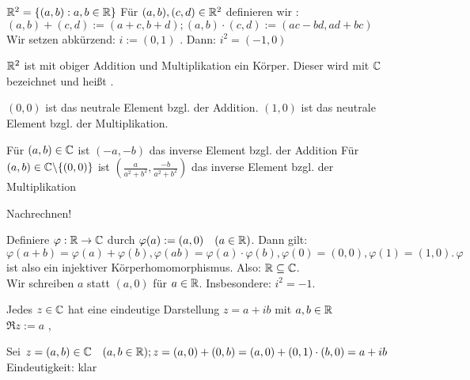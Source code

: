 \documentclass[a4paper,twoside,DIV15,BCOR12mm]{scrbook}
\begin{document}
$\mathbb{R} ^2 = \{(a,b) : a,b \in \mathbb{R}\}$ Für $(a,b),(c,d) \in \mathbb{R} ^2$ definieren wir : \\
$(a,b) + (c,d) := (a+c , b+d); (a,b)\cdot (c,d) := (ac-bd , ad+bc)$ \\
Wir setzen abkürzend: $i := (0,1)$ . Dann: $i^2 = (-1,0)$ \\

\begin{satz}
$\mathbb{R} ^2$ ist mit obiger Addition und Multiplikation ein Körper. Dieser wird mit $\mathbb{C}$ bezeichnet und heißt .

\begin{liste}
\item $(0,0)$ ist das neutrale Element bzgl. der Addition.
$(1,0)$ ist das neutrale Element bzgl. der Multiplikation.
\item Für $(a,b) \in \mathbb{C}$ ist $(-a, -b)$ das inverse Element bzgl. der Addition
Für $(a,b) \in \mathbb{C} \backslash \{(0,0)\}$ ist $(\frac{a}{a^2+b^2},\frac{-b}{a^2+b^2})$ das inverse Element bzgl. der Multiplikation
\end{liste}
\end{satz}

\begin{beweis}
Nachrechnen!
\end{beweis}

Definiere $\varphi : \mathbb{R} \rightarrow \mathbb{C}$ durch $\varphi (a) := (a,0) \quad (a \in \mathbb{R})$. Dann gilt: \\
$\varphi (a+b) = \varphi (a) + \varphi (b), \varphi (ab)= \varphi(a) \cdot \varphi(b), \varphi (0) = (0,0), \varphi(1) = (1,0). \, \varphi$ ist also ein injektiver Körperhomomorphismus. Also: $\mathbb{R} \subseteq \mathbb{C}$. \\
Wir schreiben $a$ statt $(a,0)$ für $a \in \mathbb{R}$. Insbesondere: $i^2 = -1$.

\begin{satz}
Jedes $z \in \mathbb{C}$ hat eine eindeutige Darstellung $z = a + ib$ mit $a,b \in \mathbb{R}$ \\
$\Re z := a$ , 
\end{satz}

\begin{beweis}
Sei $z = (a,b) \in \mathbb{C} \quad (a,b \in \mathbb{R}); z = (a,0) + (0,b) = (a,0) + (0,1)\cdot (b,0) = a + ib$ \\
Eindeutigkeit: klar
\end{beweis}
\end{document}
